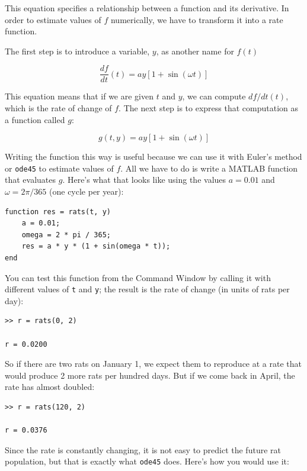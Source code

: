 \documentclass{book}
\begin{document}
This equation specifies a relationship between a
function and its derivative.  In order to estimate values of
$f$ numerically, we have to transform it into a rate function.

The first step is to introduce a variable,
$y$, as another name for $f(t)$

\begin{equation}
\frac{df}{dt}(t) = a y \left[1 + \sin (\omega t) \right]
\end{equation}

This equation means that if we are given $t$ and $y$, we can
compute $df/dt(t)$, which is the rate of change of $f$.
The next step is to express that computation as a function called
$g$:

\begin{equation}
g(t, y) = a y \left[1 + \sin (\omega t) \right]
\end{equation}

Writing the function this way is useful because we can use it
with Euler's method
or {\tt ode45} to estimate values of $f$.  All we have to
do is write a MATLAB function that evaluates $g$.  Here's what
that looks like using the values $a = 0.01$
and $\omega = 2 \pi/365$ (one cycle per year):

\begin{verbatim}
function res = rats(t, y)
    a = 0.01;
    omega = 2 * pi / 365;
    res = a * y * (1 + sin(omega * t));
end
\end{verbatim}

You can test this function from the Command Window by calling it with
different values of {\tt t} and {\tt y}; the result is the rate of
change (in units of rats per day):

\begin{verbatim}
>> r = rats(0, 2)

r = 0.0200
\end{verbatim}

So if there are two rats on January 1, we expect them to reproduce
at a rate that would produce 2 more rats per hundred days. But
if we come back in April, the rate has almost doubled:

\begin{verbatim}
>> r = rats(120, 2)

r = 0.0376
\end{verbatim}

Since the rate is constantly changing, it is not easy to predict
the future rat population, but that is exactly what {\tt ode45} does.
Here's how you would use it:
\end{document}
